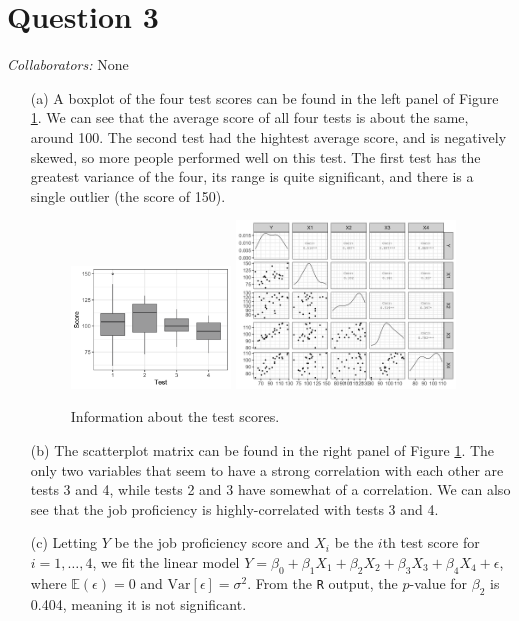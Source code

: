 \documentclass[10pt]{article}
\newcommand{\mycolaba}[1]{\textcolor{colabcol}{\textsl{Collaborators:}} #1}
\begin{document}
\section{Question 3} \noindent
\mycolaba{None}
\begin{itemize}
    \item[(a)] A boxplot of the four test scores can be found in the left panel of Figure \ref{q03-info}. We can see that the average score of all four tests is 
    about the same, around 100. The second test had the hightest average score, and is negatively skewed, so more people performed well on this test. 
    The first test has the greatest variance of the four, its range is quite significant, and there is a single outlier (the score of 150). 
    \begin{figure}[ht]
        \centering
        \includegraphics[width = 0.4\textwidth]{img/q03-boxplot.png}
        \includegraphics[width = 0.55\textwidth]{img/q03-correlation-matrix.png}
        \caption{Information about the test scores. }
        \label{q03-info}
    \end{figure}

    \item[(b)] The scatterplot matrix can be found in the right panel of Figure \ref{q03-info}. The only two variables that seem to have a strong correlation 
    with each other are tests 3 and 4, while tests 2 and 3 have somewhat of a correlation. We can also see that the job proficiency is highly-correlated with 
    tests 3 and 4. 

    \item[(c)] Letting \(Y\) be the job proficiency score and \(X_i\) be the \(i\)th test score for \(i = 1, \ldots, 4\), we fit the linear model 
    \(Y = \beta_0 + \beta_1 X_1 + \beta_2 X_2 + \beta_3 X_3 + \beta_4 X_4 + \epsilon\), where \(\mathbb{E}(\epsilon) = 0\) and \(\mathrm{Var}[\epsilon] = \sigma^2\).
    From the \texttt{R} output, the \(p\)-value for \(\beta_2\) is 0.404, meaning it is not significant. 
\end{itemize}
\end{document}

